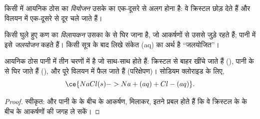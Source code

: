 \begin{definition}[वियोजन]\label{def:g11:dissolution:dissociation}
किसी  में आयनिक ठोस का \emph{वियोजन} उसके  का एक-दूसरे
से अलग होना है: वे क्रिस्टल छोड़ देते हैं और विलयन में एक-दूसरे से दूर
चले जाते हैं।
\end{definition}

\begin{definition}\label{def:g11:dissolution:solvation}
किसी घुले हुए कण का \emph{विलायकन} उसका  के  से घिर
जाना है, जो आकर्षणों से उससे जुड़े रहते हैं; पानी में इसे
\emph{जलयोजन} कहते हैं। किसी सूत्र के बाद लिखे संकेत (aq) का अर्थ है
``जलयोजित''।
\end{definition}

\begin{proposition}[घुलने के तीन चरण]\label{prop:g11:dissolution:stages}
आयनिक ठोस पानी में तीन चरणों में  है जो साथ-साथ होते हैं:
 क्रिस्टल से बाहर खींचे जाते हैं (), पानी के  से घिर जाते हैं
(), और पूरे विलयन में फैल जाते हैं
(परिक्षेपण)। सोडियम क्लोराइड के लिए,
\[
  \ce{NaCl(s) -> Na+(aq) + Cl-(aq)} .
\]
\end{proposition}

\begin{proof}
स्वीकृत:  और पानी के  के बीच के आकर्षण, मिलाकर,
इतने प्रबल होते हैं कि वे क्रिस्टल के  के बीच के आकर्षणों की जगह ले
सकें।
\end{proof}

